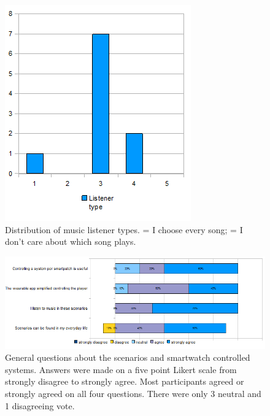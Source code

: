 \begin{figure}[bth]
	\myfloatalign
	\label{fig:listenerTypes}
	\includegraphics[width=.5\linewidth]{img/listenerTypesPlot.png}
	\caption{Distribution of music listener types.  = I choose every song;  = I don't care about which song plays.}
\end{figure}

\begin{figure}[bth]
	\myfloatalign
	\label{fig:scenarioQuestions}
	\includegraphics[width=1.2\linewidth]{img/generalQuestionsPlot.png}
	\caption{General questions about the scenarios and smartwatch controlled systems. Answers were made on a five point Likert scale from strongly disagree to strongly agree. Most participants agreed or strongly agreed on all four questions. There were only 3 neutral and 1 disagreeing vote.}
\end{figure}










